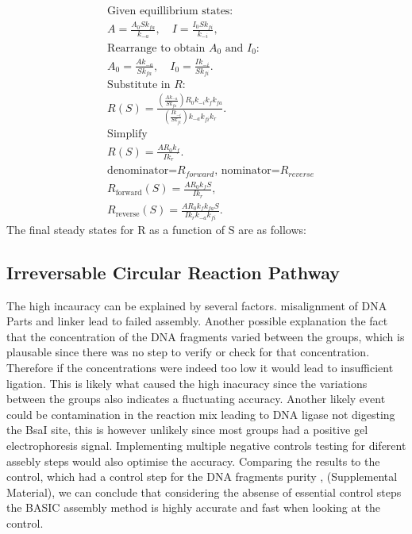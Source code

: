 \documentclass[11pt]{cls/labreport}
\begin{document}
\begin{multicols}{2}
{\begin{align}
  &\text{Given equillibrium states:} \nonumber \\[5pt]
  &A = \frac{A_0 S k_{fa}}{k_{-a}}, \quad I = \frac{I_0 S k_{fi}}{k_{-i}}, \\[10pt]
  &\text{Rearrange to obtain } A_0 \text{ and } I_0: \nonumber  \\[5pt]
  &A_0 = \frac{A k_{-a}}{S k_{fa}}, \quad I_0 = \frac{I k_{-i}}{S k_{fi}}. \\[10pt]
  &\text{Substitute in } R: \nonumber  \\[5pt]
  &R(S) = \frac{\left( \frac{A k_{-a}}{S k_{fa}} \right) R_0 k_{-i} k_{f} k_{fa}}{\left( \frac{I k_{-i}}{S k_{fi}} \right) k_{-a} k_{fi} k_{r}}. \\[10pt]  
  &\text{Simplify} \nonumber \\[5pt]
  &R(S) = \frac{A R_0 k_{f}}{I k_{r}}. \\[10pt]
  &\text{denominator=} R_{forward} \text{, nominator=} R_{reverse} \nonumber \\[5pt]
  &R_{\text{forward}}(S) = \frac{A R_0 k_{f} S}{I k_{r}}, \\[5pt]
  &R_{\text{reverse}}(S) = \frac{A R_0 k_{f} k_{fa} S}{I k_{r} k_{-a} k_{fi}}.
\end{align}
The final steady states for R as a function of S are as follows:
\subsection{Irreversable Circular Reaction Pathway}
The high incauracy can be explained by several factors. misalignment of DNA Parts and linker lead to failed assembly. Another possible explanation the fact that the concentration of the 
DNA fragments varied between the groups, which is plausable since there was no step to verify or check for that concentration. Therefore if the concentrations were indeed too low it would
lead to insufficient ligation. This is likely what caused the high inacuracy since the variations between the groups also indicates a fluctuating accuracy. Another likely event could be contamination
in the reaction mix leading to DNA ligase not digesting the BsaI site, this is however unlikely since most groups had a positive gel electrophoresis signal. Implementing multiple negative controls testing for diferent assebly steps would also optimise the accuracy.
Comparing the results to the control, which had a control step for the DNA fragments purity \cite{Storch2015}, (Supplemental Material), we can conclude that considering the absense of
essential control steps the BASIC assembly method is highly accurate and fast when looking at the control.
}
\end{multicols}
\end{document}
